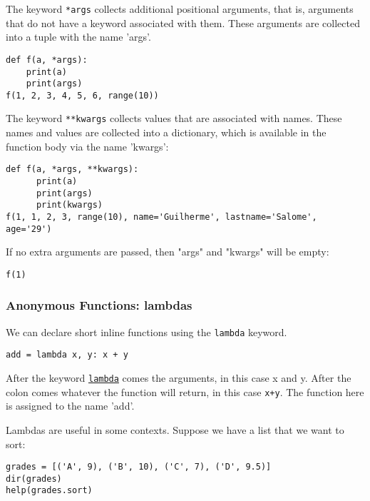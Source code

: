 \documentclass[12pt, a4paper]{article}
\begin{document}
The keyword \texttt{*args} collects additional positional arguments, that is, arguments that do not have a keyword associated with them.
These arguments are collected into a tuple with the name 'args'.
\lstset{language=jupyter-python,label= ,caption= ,captionpos=b,numbers=none}
\begin{lstlisting}
def f(a, *args):
    print(a)
    print(args)
f(1, 2, 3, 4, 5, 6, range(10))
\end{lstlisting}

The keyword \texttt{**kwargs} collects values that are associated with names.
These names and values are collected into a dictionary, which is available in the function body via the name 'kwargs':
\lstset{language=jupyter-python,label= ,caption= ,captionpos=b,numbers=none}
\begin{lstlisting}
def f(a, *args, **kwargs):
      print(a)
      print(args)
      print(kwargs)
f(1, 1, 2, 3, range(10), name='Guilherme', lastname='Salome', age='29')
\end{lstlisting}

If no extra arguments are passed, then "args" and "kwargs" will be empty:
\lstset{language=jupyter-python,label= ,caption= ,captionpos=b,numbers=none}
\begin{lstlisting}
f(1)
\end{lstlisting}
\subsubsection{Anonymous Functions: lambdas}
\label{sec:orge6a4a8c}
We can declare short inline functions using the \texttt{lambda} keyword.
\lstset{language=jupyter-python,label= ,caption= ,captionpos=b,numbers=none}
\begin{lstlisting}
add = lambda x, y: x + y
\end{lstlisting}
After the keyword \href{https://docs.python.org/3.6/tutorial/controlflow.html?\#lambda-expressions}{\texttt{lambda}} comes the arguments, in this case x and y. After the colon comes whatever the function will return, in this case \texttt{x+y}.
The function here is assigned to the name 'add'.

Lambdas are useful in some contexts.
Suppose we have a list that we want to sort:
\lstset{language=jupyter-python,label= ,caption= ,captionpos=b,numbers=none}
\begin{lstlisting}
grades = [('A', 9), ('B', 10), ('C', 7), ('D', 9.5)]
dir(grades)
help(grades.sort)
\end{lstlisting}
\end{document}
